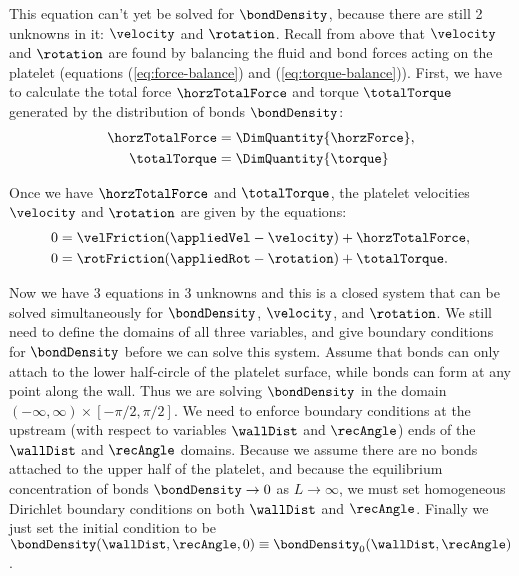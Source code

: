 This equation can't yet be solved for $\bondDensity$, because there
are still 2 unknowns in it: $\velocity$ and $\rotation$. Recall from
above that $\velocity$ and $\rotation$ are found by balancing the
fluid and bond forces acting on the platelet (equations
(\ref{eq:force-balance}) and (\ref{eq:torque-balance})). First, we
have to calculate the total force $\horzTotalForce$ and torque
$\totalTorque$ generated by the distribution of bonds $\bondDensity$:
\begin{align}
  \label{eq:horz-total-force}
  \horzTotalForce &= \DimQuantity{\horzForce}, \\ 
  \label{eq:total-torque}
  \totalTorque &= \DimQuantity{\torque}
\end{align}

Once we have $\horzTotalForce$ and $\totalTorque$, the platelet velocities
$\velocity$ and $\rotation$ are given by the equations:
\begin{align}
  \label{eq:force-balance}
  0 &= \velFriction (\appliedVel - \velocity) + \horzTotalForce, \\
  \label{eq:torque-balance}
  0 &= \rotFriction (\appliedRot - \rotation) + \totalTorque.
\end{align}

Now we have 3 equations in 3 unknowns and this is a closed system that
can be solved simultaneously for $\bondDensity$, $\velocity$, and
$\rotation$. We still need to define the domains of all three
variables, and give boundary conditions for $\bondDensity$ before we
can solve this system. Assume that bonds can only attach to the lower
half-circle of the platelet surface, while bonds can form at any point
along the wall. Thus we are solving $\bondDensity$ in the domain
$(-\infty, \infty) \times [-\pi/2, \pi/2]$. We need to enforce
boundary conditions at the upstream (with respect to variables
$\wallDist$ and $\recAngle$) ends of the $\wallDist$ and $\recAngle$
domains. Because we assume there are no bonds attached to the upper
half of the platelet, and because the equilibrium concentration of
bonds $\bondDensity \rightarrow 0$ as $L \rightarrow \infty$, we must
set homogeneous Dirichlet boundary conditions on both $\wallDist$ and
$\recAngle$. Finally we just set the initial condition to be
$\bondDensity(\wallDist, \recAngle, 0) \equiv \bondDensity_0(\wallDist,
\recAngle)$.


